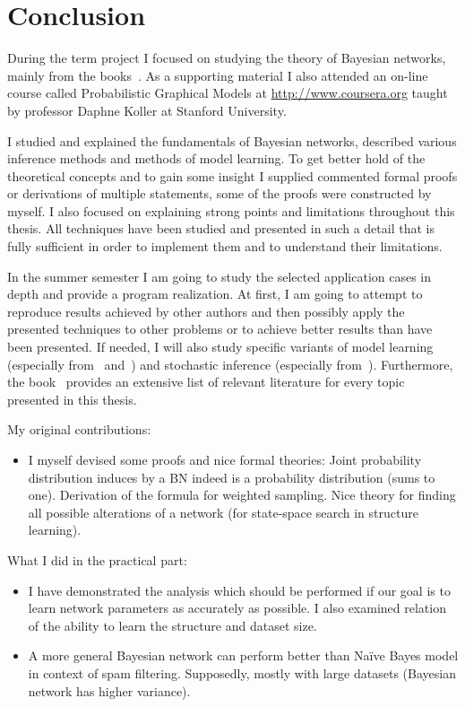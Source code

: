 \documentclass[english,cover]{fitthesis} %
\begin{document}
\chapter{Conclusion}
During the term project I focused on studying the theory of Bayesian networks, mainly from the books~\cite{pgm,russell_norvig_ed2}. As a supporting material I also attended an on-line course called Probabilistic Graphical Models at \url{http://www.coursera.org} taught by professor Daphne Koller at Stanford University.

I studied and explained the fundamentals of Bayesian networks, described various inference methods and methods of model learning. To get better hold of the theoretical concepts and to gain some insight I supplied commented formal proofs or derivations of multiple statements, some of the proofs were constructed by myself. I also focused on explaining strong points and limitations throughout this thesis. All techniques have been studied and presented in such a detail that is fully sufficient in order to implement them and to understand their limitations.

\medskip

In the summer semester I am going to study the selected application cases in depth and provide a program realization. At first, I am going to attempt to reproduce results achieved by other authors and then possibly apply the presented techniques to other problems or to achieve better results than have been presented. If needed, I will also study specific variants of model learning (especially from~\cite{heckerman96_tutorial} and~\cite{buntine94}) and stochastic inference (especially from~\cite{neal93}). Furthermore, the book~\cite{pgm} provides an extensive list of relevant literature for every topic presented in this thesis. %

My original contributions:
\begin{itemize}
	\item I myself devised some proofs and nice formal theories: Joint probability distribution induces by a BN indeed is a probability distribution (sums to one). Derivation of the formula for weighted sampling. Nice theory for finding all possible alterations of a network (for state-space search in structure learning).
\end{itemize}

What I did in the practical part:
\begin{itemize}
    \item I have demonstrated the analysis which should be performed if our goal is to learn network parameters as accurately as possible. I also examined relation of the ability to learn the  structure and dataset size.
    \item A more general Bayesian network can perform better than Naïve Bayes model in context of spam filtering. Supposedly, mostly with large datasets (Bayesian network has higher variance).
\end{itemize}
\end{document}

